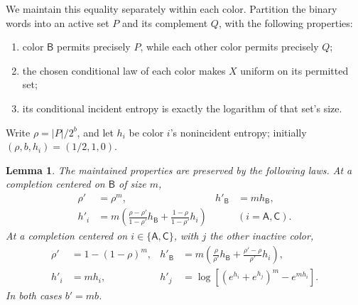 \documentclass[11pt]{article}
\numberwithin{equation}{section}
\newtheorem{lemma}[theorem]{Lemma}
\theoremstyle{definition}
\theoremstyle{remark}
\newcommand{\colA}{\mathsf A}
\newcommand{\colB}{\mathsf B}
\newcommand{\colC}{\mathsf C}
\begin{document}
We maintain this equality separately within each color.
Partition the binary words into an active set \(P\) and its complement
\(Q\), with the following properties:
\begin{enumerate}
 \item color \(\colB\) permits precisely \(P\), while each other color
 permits precisely \(Q\);
 \item the chosen conditional law of each color makes \(X\) uniform on
 its permitted set;
 \item its conditional incident entropy is exactly the logarithm of
 that set's size.
\end{enumerate}
Write \(\rho=|P|/2^b\), and let \(h_i\) be color \(i\)'s nonincident
entropy; initially \((\rho,b,h_i)=(1/2,1,0)\).

\begin{lemma}\label{lem:uniform-update}
The maintained properties are preserved by the following laws.
At a completion centered on \(\colB\) of size \(m\),
\begin{align}
 \rho'&=\rho^m,& h'_{\colB}&=m h_{\colB}, \label{eq:minus-rho}\\
 h'_i&=
 m\left(\frac{\rho-\rho'}{1-\rho'}h_{\colB}
         +\frac{1-\rho}{1-\rho'}h_i\right)
       &&(i=\colA,\colC). \label{eq:minus-h}
\end{align}
At a completion centered on \(i\in\{\colA,\colC\}\), with \(j\) the
other inactive color,
\begin{align}
 \rho'&=1-(1-\rho)^m,&
 h'_{\colB}&=
 m\left(\frac{\rho}{\rho'}h_{\colB}
       +\frac{\rho'-\rho}{\rho'}h_i\right), \label{eq:plus-rho}\\
 h'_i&=mh_i,&
 h'_j&=\log\left[(e^{h_i}+e^{h_j})^m-e^{mh_i}\right].
 \label{eq:plus-h}
\end{align}
In both cases \(b'=mb\).
\end{lemma}
\end{document}
